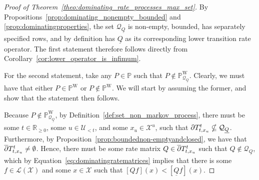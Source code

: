 \documentclass[10pt]{paper}
\theoremstyle{definition}
\newcommand{\reals}{\mathbb{R}}
\newcommand{\realsnonneg}{\reals_{\geq 0}}
\newcommand{\states}{\mathcal{X}}
\newcommand{\processes}{\mathbb{P}}
\newcommand{\wprocesses}{\processes^{\mathrm{W}}}
\newcommand{\gambles}{\mathcal{L}}
\newcommand{\gamblesX}{\gambles(\states)}
\newcommand{\rateset}{\mathcal{Q}}
\newcommand{\lrate}{\underline{Q}}
\begin{document}
\begin{proof}[Proof of Theorem~\ref{theo:dominating_rate_processes_max_set}]
By Propositions~\ref{prop:dominating_nonempty_bounded} and \ref{prop:dominatingproperties}, the set $\rateset_{\lrate}$ is non-empty, bounded, has separately specified rows, and by definition has $\lrate$ as its corresponding lower transition rate operator. The first statement therefore follows directly from Corollary~\ref{cor:lower_operator_is_infimum}.

For the second statement, take any $P\in\processes$ such that $P\notin\wprocesses_{\rateset_{\lrate}}$. Clearly, we must have that either $P\in\wprocesses$ or $P\notin\wprocesses$. We will start by assuming the former, and show that the statement then follows.

Because $P\notin\wprocesses_{\rateset_{\lrate}}$, by Definition~\ref{def:set_non_markov_process}, there must be some $t\in\realsnonneg$, some $u\in\mathcal{U}_{<t}$, and some $x_u\in\states^u$, such that $\smash{\overline{\partial}}T_{t,x_u}^{t}\nsubseteq\rateset_{\lrate}$. Furthermore, by Proposition~\ref{prop:boundednon-emptyandclosed}, we have that $\smash{\overline{\partial}}T_{t,x_u}^{t}\neq\emptyset$. Hence, there must be some rate matrix $Q\in\smash{\overline{\partial}}T_{t,x_u}^{t}$ such that $Q\notin\rateset_{\lrate}$, which by Equation~\eqref{eq:dominatingratematrices} implies that there is some $f\in\gamblesX$ and some $x\in\states$ such that $\left[Qf\right](x)<\left[\lrate f\right](x)$.


\end{proof}
\end{document}
